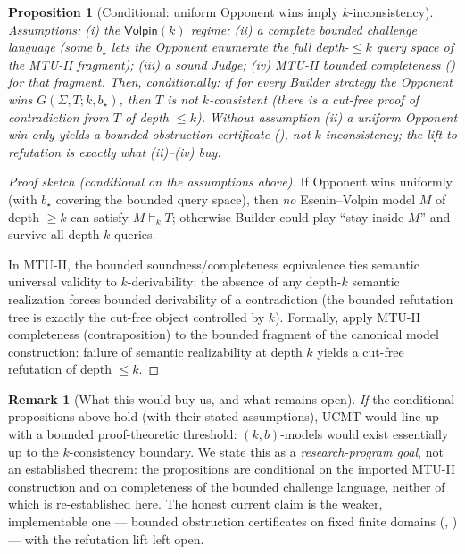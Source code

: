 \documentclass[11pt]{article}
\theoremstyle{definition}
\newtheorem{remark}{Remark}[section]
\theoremstyle{plain}
\newtheorem{proposition}[definition]{Proposition}
\newcommand{\Sig}{\Sigma}
\begin{document}
\begin{proposition}[Conditional: uniform Opponent wins imply $k$-inconsistency]
\label{prop:uniform-failure-refutation}
\emph{Assumptions:} (i) the $\mathsf{Volpin}(k)$ regime; (ii) a complete bounded challenge language
(some $b_\star$ lets the Opponent enumerate the full depth-$\le k$ query space of the MTU-II fragment);
(iii) a sound Judge; (iv) MTU-II bounded completeness () for that fragment.
\emph{Then, conditionally:} if for every Builder strategy the Opponent wins $G(\Sig,T;k,b_\star)$, then
$T$ is not $k$-consistent (there is a cut-free proof of contradiction from $T$ of depth $\le k$).
Without assumption (ii) a uniform Opponent win only yields a \emph{bounded obstruction certificate}
(), \emph{not} $k$-inconsistency; the lift to refutation is exactly what (ii)--(iv) buy.
\end{proposition}

\begin{proof}[Proof sketch (conditional on the assumptions above)]
If Opponent wins uniformly (with $b_\star$ covering the bounded query space), then \emph{no}
Esenin--Volpin model $M$ of depth $\ge k$ can satisfy $M \models_k T$; otherwise Builder could
play ``stay inside $M$'' and survive all depth-$k$ queries.

In MTU-II, the bounded soundness/completeness equivalence ties semantic universal validity
to $k$-derivability: the absence of any depth-$k$ semantic realization forces bounded derivability
of a contradiction (the bounded refutation tree is exactly the cut-free object controlled by $k$).
Formally, apply MTU-II completeness (contraposition) to the bounded fragment of the canonical model
construction: failure of semantic realizability at depth $k$ yields a cut-free refutation of depth $\le k$.
\end{proof}

\begin{remark}[What this would buy us, and what remains open]
\emph{If} the conditional propositions above hold (with their stated assumptions), UCMT would line up
with a bounded proof-theoretic threshold: $(k,b)$-models would exist essentially up to the
$k$-consistency boundary. We state this as a \emph{research-program goal}, not an established theorem:
the propositions are conditional on the imported MTU-II construction and on completeness of the bounded
challenge language, neither of which is re-established here. The honest current claim is the weaker,
implementable one --- bounded obstruction certificates on fixed finite domains
(, ) --- with the refutation lift left open.
\end{remark}
\end{document}
